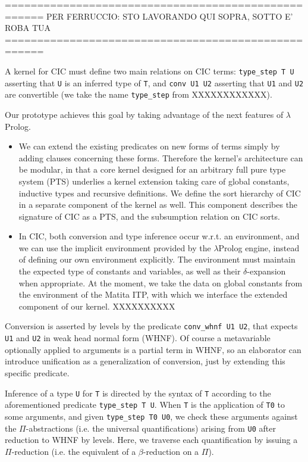 ====================================================
PER FERRUCCIO: STO LAVORANDO QUI SOPRA, SOTTO E' ROBA TUA
====================================================

A kernel for CIC must define two main relations on CIC terms:
\verb+type_step T U+
asserting that \verb+U+ is an inferred type of \verb+T+,
and \verb+conv U1 U2+ 
asserting that \verb+U1+ and \verb+U2+ are convertible
(we take the name \verb+type_step+ from XXXXXXXXXXXX).

Our prototype achieves this goal by taking advantage of the next features of $\lambda$Prolog.

\begin{itemize}

\item
We can extend the existing predicates on new forms of terms
simply by adding clauses concerning these forms. 
Therefore the kernel's architecture can be modular,
in that a core kernel designed for an arbitrary full pure type system (PTS)
underlies a kernel extension taking care of global constants,
inductive types and recursive definitions.
We define the sort hierarchy of CIC in a separate component of the kernel as well.
This component describes the signature of CIC as a PTS,
and the subsumption relation on CIC sorts.

\item
In CIC, both conversion and type inference occur w.r.t. an environment,
and we can use the implicit environment provided by the
$\lambda$Prolog engine, instead of defining our own environment explicitly.
The environment must maintain the expected type of constants and variables,
as well as their $\delta$-expansion when appropriate.
At the moment, we take the data on global constants from the
environment of the Matita ITP, with which we interface the extended
component of our kernel. XXXXXXXXXX

\end{itemize}

Conversion is asserted by levels by the predicate \verb+conv_whnf U1 U2+,
that expects \verb+U1+ and \verb+U2+ in weak head normal form (WHNF).
Of course a metavariable optionally applied to arguments is a partial
term in WHNF, so an elaborator can introduce unification as a
generalization of conversion, just by extending this specific predicate.

Inference of a type \verb+U+ for \verb+T+ is directed by the syntax of \verb+T+
according to the aforementioned predicate \verb+type_step T U+.
When \verb+T+ is the application of \verb+T0+ to some arguments,
and given \verb+type_step T0 U0+,
we check these arguments against the $\Pi$-abstractions (i.e. the
universal quantifications) arising from \verb+U0+ after reduction to
WHNF by levels. Here, we traverse each quantification by issuing a $\Pi$-reduction
(i.e. the equivalent of a $\beta$-reduction on a $\Pi$).

